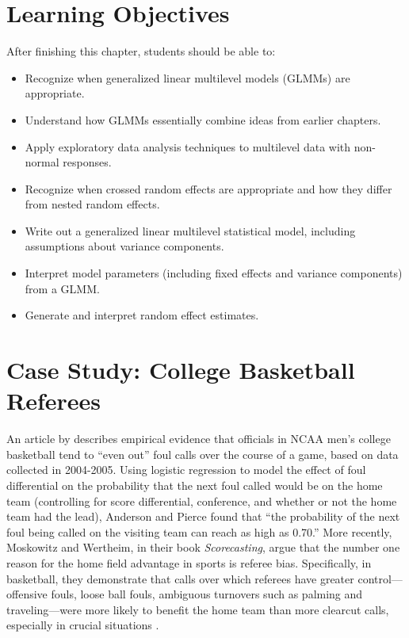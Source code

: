 \documentclass[
]{krantz}
\providecommand{\tightlist}{%
  \setlength{\itemsep}{0pt}\setlength{\parskip}{0pt}}
\begin{document}
\hypertarget{objectives}{%
\section{Learning Objectives}\label{objectives}}

After finishing this chapter, students should be able to:

\begin{itemize}
\tightlist
\item
  Recognize when generalized linear multilevel models (GLMMs) are appropriate.
\item
  Understand how GLMMs essentially combine ideas from earlier chapters.
\item
  Apply exploratory data analysis techniques to multilevel data with non-normal responses.
\item
  Recognize when crossed random effects are appropriate and how they differ from nested random effects.
\item
  Write out a generalized linear multilevel statistical model, including assumptions about variance components.
\item
  Interpret model parameters (including fixed effects and variance components) from a GLMM.
\item
  Generate and interpret random effect estimates.
\end{itemize}

\hypertarget{cs:refs}{%
\section{Case Study: College Basketball Referees}\label{cs:refs}}

An article by \citet{Anderson2009} describes empirical evidence that officials in NCAA men's college basketball tend to ``even out'' foul calls over the course of a game, based on data collected in 2004-2005. Using logistic regression to model the effect of foul differential on the probability that the next foul called would be on the home team (controlling for score differential, conference, and whether or not the home team had the lead), Anderson and Pierce found that ``the probability of the next foul being called on the visiting team can reach as high as 0.70.'' More recently, Moskowitz and Wertheim, in their book \emph{Scorecasting}, argue that the number one reason for the home field advantage in sports is referee bias. Specifically, in basketball, they demonstrate that calls over which referees have greater control---offensive fouls, loose ball fouls, ambiguous turnovers such as palming and traveling---were more likely to benefit the home team than more clearcut calls, especially in crucial situations \citep{Moskowitz2011}.
\end{document}
